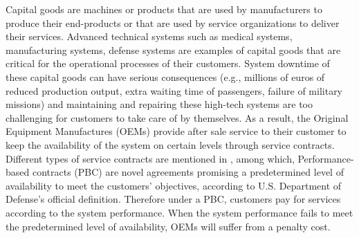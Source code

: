 \documentclass[preprint,12pt]{elsarticle}
\begin{document}
Capital goods are machines or products that are used by manufacturers to produce their end-products or that are used by service organizations to deliver their services. Advanced technical systems such as medical systems, manufacturing systems, defense systems are examples of capital goods that are critical for the operational processes of their customers. System downtime of these capital goods can have serious consequences (e.g., millions of euros of reduced production output, extra waiting time of passengers, failure of military missions) and maintaining and repairing these high-tech systems are too challenging for customers to take care of by themselves. As a result, the Original Equipment Manufactures (OEMs) provide after sale service to their customer to keep the availability of the system on certain levels through service contracts. Different types of service contracts are mentioned in \citet{Cohen2006}, among which, Performance-based contracts (PBC) are novel agreements promising a predetermined level of availability to meet the customers' objectives, according to U.S. Department of Defense's official definition. Therefore under a PBC, customers pay for services according to the system performance. When the system performance fails to meet the predetermined level of availability, OEMs will suffer from a penalty cost.


\end{document}
